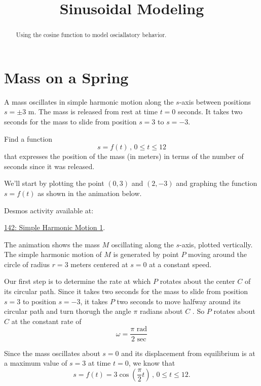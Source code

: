 \documentclass{ximera}
\title{Sinusoidal Modeling}
\begin{document}
\begin{abstract}
Using the cosine function to model osciallatory behavior.
\end{abstract}
\maketitle


\section{Mass on a Spring}
\begin{example}  \label{Efdbgthyn}
A mass oscillates in simple harmonic motion along the $s$-axis between positions $s=\pm 3$ m. The mass is released from rest at time $t=0$ seconds. It takes two seconds for the mass to slide from position $s=3$ to $s=-3$. 

Find a function
\[
   s = f(t) \, , \, 0\leq t \leq 12
\]  
that expresses the position of the mass (in meters) in terms of the number of seconds since it was released.

\begin{explanation}


We'll start by plotting the point $(0,3)$ and $(2,-3)$ and graphing the function $s=f(t)$ as shown in the animation below. 

Desmos activity available at:

\href{https://www.desmos.com/calculator/yaopsldty0}{142: Simple Harmonic Motion 1}.

 
\begin{onlineOnly}
    \begin{center}
\end{center}
\end{onlineOnly}

The animation shows the mass $M$ oscillating along the $s$-axis, plotted vertically. The simple harmonic motion of $M$ is generated by point $P$ moving around the circle of radius $r=3$ meters centered at $s=0$ at a constant speed. 

Our first step is to determine the rate at which $P$ rotates about the center $C$ of its circular path. Since it takes two seconds for the mass to slide from position $s=3$ to position $s=-3$, it takes $P$ two seconds to move halfway around its circular path and turn thorugh the angle $\pi$ radians about $C$ . So $P$ rotates about $C$ at the constant rate of
\[
  \omega = \frac{\pi \text{ rad}}{2 \text{ sec}} %
\]   


Since the mass oscillates about $s=0$ and its displacement from equilibrium is at a maximum value of $s=3$ at time $t=0$, we know that  
\[
  s = f(t) = 3\cos\left( \frac{\pi}{2}t \right) \, , \, 0\leq t \leq 12.
\]

\end{explanation}


\end{example}
\end{document}
